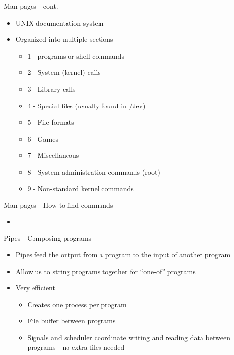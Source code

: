 \documentclass[t]{beamer}
\begin{document}
\begin{frame}{Man pages - cont.}
  \begin{itemize}
  \item UNIX documentation system
  \item Organized into multiple sections
    \begin{itemize}
    \item 1 - programs or shell commands
    \item 2 - System (kernel) calls
    \item 3 - Library calls
    \item 4 - Special files (usually found in /dev)
    \item 5 - File formats
    \item 6 - Games
    \item 7 - Miscellaneous
    \item 8 - System administration commands (root)
    \item 9 - Non-standard kernel commands
    \end{itemize}
  \end{itemize}
  \note{}
\end{frame}

\begin{frame}{Man pages - How to find commands}
  \begin{itemize}
  \item 
  \end{itemize}
\end{frame}

\begin{frame}{Pipes - Composing programs}
  \begin{itemize}
  \item Pipes feed the output from a program to the input of another program
  \item Allow us to string programs together for ``one-of'' programs
  \item Very efficient 
    \begin{itemize}
    \item Creates one process per program
    \item File buffer between programs
    \item Signals and scheduler coordinate writing and reading data
      between programs - no extra files needed
    \end{itemize}
  \end{itemize}
  \note{}
\end{frame}
\end{document}
